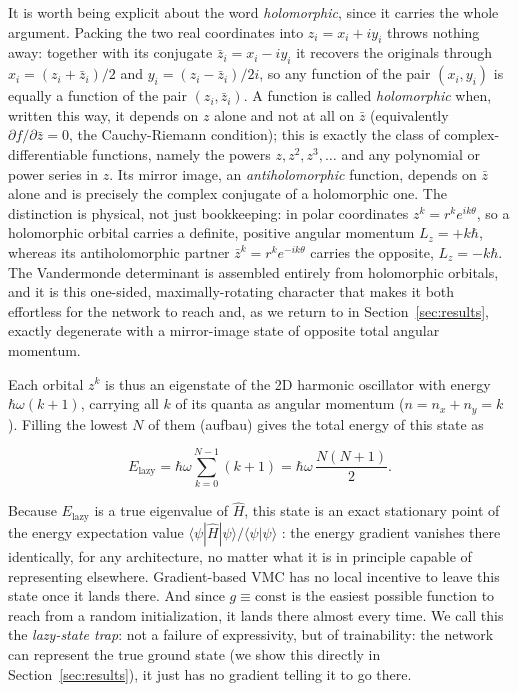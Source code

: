 \documentclass[a4paper,11pt,twoside]{article}
\begin{document}
It is worth being explicit about the word \textit{holomorphic}, since it carries the whole argument. Packing the two real coordinates into $z_i = x_i + i y_i$ throws nothing away: together with its conjugate $\bar z_i = x_i - i y_i$ it recovers the originals through $x_i = (z_i + \bar z_i)/2$ and $y_i = (z_i - \bar z_i)/2i$, so any function of the pair $(x_i, y_i)$ is equally a function of the pair $(z_i, \bar z_i)$. A function is called \textit{holomorphic} when, written this way, it depends on $z$ alone and not at all on $\bar z$ (equivalently $\partial f / \partial \bar z = 0$, the Cauchy-Riemann condition); this is exactly the class of complex-differentiable functions, namely the powers $z, z^2, z^3, \dots$ and any polynomial or power series in $z$. Its mirror image, an \textit{antiholomorphic} function, depends on $\bar z$ alone and is precisely the complex conjugate of a holomorphic one. The distinction is physical, not just bookkeeping: in polar coordinates $z^k = r^k e^{ik\theta}$, so a holomorphic orbital carries a definite, positive angular momentum $L_z = +k\hbar$, whereas its antiholomorphic partner $\bar z^k = r^k e^{-ik\theta}$ carries the opposite, $L_z = -k\hbar$. The Vandermonde determinant is assembled entirely from holomorphic orbitals, and it is this one-sided, maximally-rotating character that makes it both effortless for the network to reach and, as we return to in Section~\ref{sec:results}, exactly degenerate with a mirror-image state of opposite total angular momentum.

Each orbital $z^k$ is thus an eigenstate of the 2D harmonic oscillator with energy $\hbar\omega(k+1)$, carrying all $k$ of its quanta as angular momentum ($n = n_x + n_y = k$). Filling the lowest $N$ of them (aufbau) gives the total energy of this state as

\begin{equation}
    E_{\text{lazy}} = \hbar\omega \sum_{k=0}^{N-1} (k+1) = \hbar\omega\, \frac{N(N+1)}{2}.
\end{equation}

Because $E_\text{lazy}$ is a true eigenvalue of $\hat H$, this state is an exact stationary point of the energy expectation value $\langle \psi | \hat H | \psi\rangle / \langle \psi|\psi\rangle$ \cite{becca_quantum_2017}: the energy gradient vanishes there identically, for any architecture, no matter what it is in principle capable of representing elsewhere. Gradient-based VMC has no local incentive to leave this state once it lands there. And since $g \equiv \text{const}$ is the easiest possible function to reach from a random initialization, it lands there almost every time. We call this the \textit{lazy-state trap}: not a failure of expressivity, but of trainability: the network can represent the true ground state (we show this directly in Section~\ref{sec:results}), it just has no gradient telling it to go there.
\end{document}
